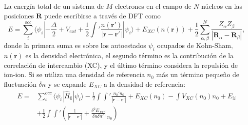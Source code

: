 La energía total de un sistema de $M$ electrones en el campo de $N$ núcleos en
las posiciones $\mathbf{R}$ puede escribirse a través de DFT como
\begin{equation*}
E = \sum_i^{occ} \langle \psi_i | - \frac{\Delta}{2} + V_{ext} + \frac{1}{2} \int' \frac{n(\mathbf{r}')}{|\mathbf{r} - \mathbf{r}'|} | \psi_i \rangle + E_{XC}(n(\mathbf{r})) + \frac{1}{2} \sum_{\alpha, \beta}^N \frac{Z_{\alpha}Z_{\beta}}{|\mathbf{R}_{\alpha} - \mathbf{R}_{\beta}|},
\end{equation*}
donde la primera suma es sobre los autoestados $\psi_i$ ocupados de Kohn-Sham,
$n(\mathbf{r})$ es la densidad electrónica, el segundo término es la contribución
de la correlación de intercambio (XC), y el último término considera la repulsión
de ion-ion. Si se utiliza una densidad de referencia $n_0$ más un término 
pequeño de fluctuación $\delta n$ y se expande $E_{XC}$ a la densidad de 
referencia:
\begin{equation}\label{eq:dft-fluc}
    \begin{aligned}
        E =& \sum_i^{occ} \langle \psi_i | \hat{H}_0 | \psi_i \rangle - \frac{1}{2} \int \int' \frac{n_0' n_0}{|\mathbf{r} - \mathbf{r}'|} + E_{XC}(n_0) - \int V_{XC}(n_0)n_0 + E_{ii} \\
        &+ \frac{1}{2} \int \int' \left(\frac{1}{|\mathbf{r} - \mathbf{r}'|} + \frac{\delta^2 E_{XC}}{\delta n \delta n'}\bigg\rvert_{n_0} \right)
    \end{aligned}
\end{equation}

